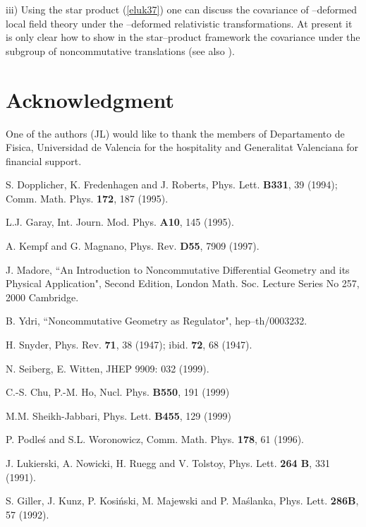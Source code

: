 \documentclass[a4paper,12pt]{article}
\begin{document}
   iii) Using the star  product (\ref{eluk37}) one can discuss the
   covariance of \myHighlight{$\kappa$}\coordHE{}--deformed local field theory under the
   \myHighlight{$\kappa$}\coordHE{}--deformed relativistic transformations. At present it
   is only clear how to show in the star--product framework the
   covariance under the subgroup of noncommutative translations
   (see also \cite{rluk14}).

\section*{Acknowledgment}
  One of the authors (JL) would like to thank the members of 
Departamento 
de Fisica, Universidad de Valencia for the hospitality and 
Generalitat 
Valenciana for financial support.

\begin{thebibliography}{99}

 S. Dopplicher, K. Fredenhagen and J. Roberts,
  Phys. Lett. {\bf B331}, {39}
(1994);  Comm. Math. Phys.  {\bf 172}, {187} (1995).

 L.J. Garay, Int. Journ. Mod. Phys.
    {\bf A10}, {145} (1995).

 A. Kempf and G. Magnano,   Phys.
 Rev. {\bf D55}, {7909} (1997).

 J. Madore, ``An Introduction to Noncommutative
 Differential Geometry and its Physical Application", Second
 Edition, London Math. Soc. Lecture Series No 257, 2000 
Cambridge.

  B. Ydri, ``Noncommutative Geometry as 
 Regulator", hep--th/0003232.


 H. Snyder, Phys. Rev.  {\bf 71}, 38 (1947);
 ibid. {\bf 72}, 68 (1947).

  N. Seiberg, E. Witten, JHEP 9909: 032 (1999).

 C.-S. Chu, P.-M. Ho, Nucl. Phys. {\bf B550}, 191 
(1999)

 M.M. Sheikh-Jabbari, Phys. Lett. {\bf B455}, 129 
(1999)

 P. Podle\'{s} and S.L. Woronowicz, Comm. Math.
Phys. {\bf 178}, 61 (1996).

 J. Lukierski, A. Nowicki, H. Ruegg and V.
Tolstoy,
 Phys. Lett. {\bf 264 B}, 331 (1991).

  S. Giller, J. Kunz, P. Kosi\'{n}ski, M. Majewski
  and P. Ma\'{s}lanka, Phys. Lett. {\bf 286B}, 57 (1992).


\end{thebibliography}
\end{document}
